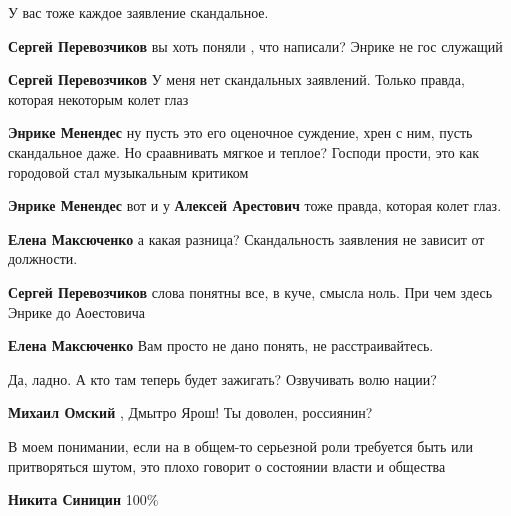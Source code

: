  
 
 
 
 
\zzSecCmt

\begin{itemize} %
У вас тоже каждое заявление скандальное.

\begin{itemize} %
\textbf{Сергей Перевозчиков} вы хоть поняли , что написали? Энрике не гос служащий

\textbf{Сергей Перевозчиков} У меня нет скандальных заявлений. Только правда, которая некоторым колет глаз

\textbf{Энрике Менендес} ну пусть это его оценочное суждение, хрен с ним, пусть скандальное даже. Но сраавнивать мягкое и теплое? Господи прости, это как городовой стал музыкальным критиком

\textbf{Энрике Менендес} вот и у \textbf{Алексей Арестович} тоже правда, которая колет глаз.

\textbf{Елена Максюченко} а какая разница? Скандальность заявления не зависит от должности.

\textbf{Сергей Перевозчиков} слова понятны все, в куче, смысла ноль. При чем здесь Энрике до Аоестовича

\textbf{Елена Максюченко} Вам просто не дано понять, не расстраивайтесь.
\end{itemize} %

Да, ладно. А кто там теперь будет зажигать? Озвучивать волю нации?

\textbf{Михаил Омский} , Дмытро Ярош! Ты доволен, россиянин?


В моем понимании, если на в общем-то серьезной роли требуется быть или
притворяться шутом, это плохо говорит о состоянии власти и общества

\begin{itemize} %
\textbf{Никита Синицин} 100\%


\end{itemize}
\end{itemize}
